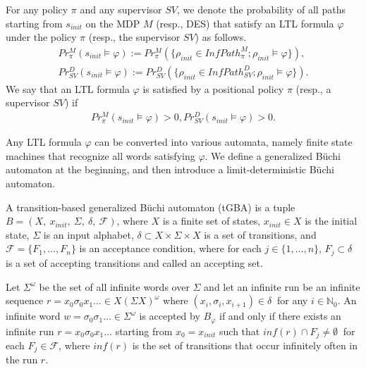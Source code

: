 \documentclass[a4j,12pt,oneside,openany,english,dvipdfmx]{jsbook}
\begin{document}
\begin{definition}
For any policy $\pi$ and any supervisor $SV$, we denote the probability of all paths starting from $s_{init}$ on the MDP $M$ (resp., DES) that satisfy an LTL formula $\varphi$ under the policy $\pi$ (resp., the supervisor $SV$) as follows.
\begin{align*}
Pr^{M}_{\pi}(s_{init} \! \models \varphi) := Pr^{M}_{\pi}(\{ \rho_{init} \! \in \! InfPath^{M}_{\pi} ; \rho_{init} \! \models \varphi \}), \\
Pr^{D}_{SV}(s_{init} \! \models \varphi) := Pr^{D}_{SV}(\{ \rho_{init} \! \in \! InfPath^{D}_{SV} ; \rho_{init} \! \models \varphi \}).
\end{align*}
We say that an LTL formula $\varphi$ is satisfied by a positional policy $\pi$ (resp., a supervisor $SV$) if
\begin{align*}
Pr^{M}_{\pi}(s_{init} \models \varphi) > 0,
Pr^{D}_{SV}(s_{init} \models \varphi) > 0.
\end{align*}



\label{def5}
\end{definition}

Any LTL formula $\varphi$ can be converted into various automata, namely finite state machines that recognize %
all words satisfying $\varphi$.
 We define a generalized B\"{u}chi automaton at the beginning, and then introduce a limit-deterministic B\"{u}chi automaton.

\begin{definition}
  A transition-based generalized B\"{u}chi automaton (tGBA) is a tuple $B = (X,\ x_{init},\ \Sigma,\ \delta,\ \mathcal{F})$, where $X$ is a finite set of states, $x_{init} \in X$ is the initial state, $\Sigma$ is an input alphabet, $\delta \subset  X\times \Sigma \times X$ is a set of transitions, and $\mathcal{F} = \{F_1,\ldots,F_n\}$ is an acceptance condition, where for each $ j \in \{1,\ldots,n\}$, $F_j \subset \delta$ is a set of accepting transitions and called an accepting set.

  Let $\Sigma^{\omega}$ be the set of all infinite words over $\Sigma$ and let an infinite run be an infinite sequence $r = x_0\sigma_0x_1 \ldots \in X (\Sigma X)^{\omega}$ where $(x_i, \sigma_{i}, x_{i+1}) \in \delta\ $ for any $ i\in \mathbb{N}_0$. An infinite word $w = \sigma_0\sigma_1 \ldots \in \Sigma^{\omega}$ is accepted by $B_{\varphi}$ if and only if there exists an infinite run $r = x_0 \sigma_0 x_1 \ldots$ starting from $x_0 = x_{init}$ such that $inf(r) \cap F_j \neq \emptyset\ $ for each $F_j \in \mathcal{F}$, where $inf(r)$ is the set of transitions that occur infinitely often in the run $r$.
\end{definition}
\end{document}
